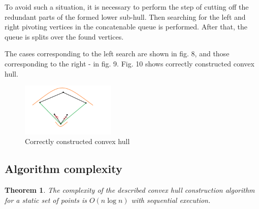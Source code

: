 \documentclass[conference]{IEEEtran}
\theoremstyle{plane}
\newtheorem{theorem}{Theorem}[section]
\begin{document}
To avoid such a situation, it is necessary to perform the step of cutting off the redundant parts of the formed lower sub-hull. Then searching for the left and right pivoting vertices in the concatenable queue is performed. After that, the queue is splits over the found vertices.

The cases corresponding to the left search are shown in fig. 8, and those corresponding to the right - in fig. 9. Fig. 10 shows correctly constructed convex hull.

\begin{figure}[htbp]
	\centerline{\includegraphics[width=0.4\textwidth, height=0.2\textheight]{correct_convex_hull}}
	\caption{Correctly constructed convex hull}
	\label{correct_convex_hull}
\end{figure}


\subsection{Algorithm complexity}

\begin{theorem}
	The complexity of the described convex hull construction algorithm for a static set of points is $O(n\log n)$ with sequential execution.
\end{theorem}
\end{document}
